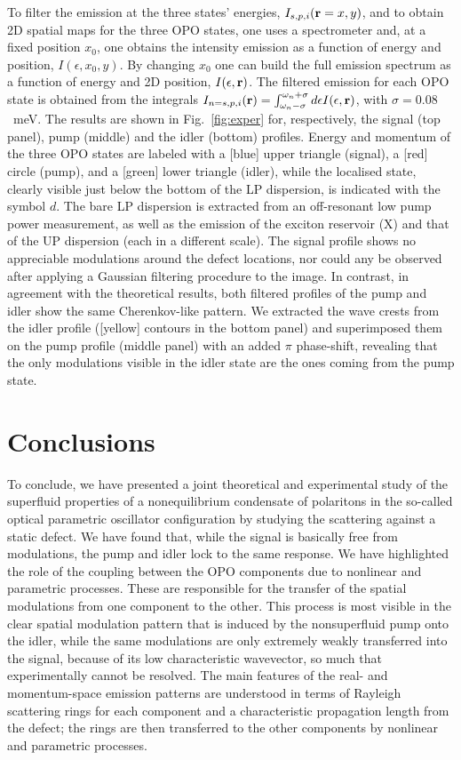 To filter the emission at the three states' energies,
$I_{s,p,i}(\mathbf{r}=x,y)$, and to obtain 2D spatial maps for the three
OPO states, one uses a spectrometer and, at a fixed position $x_0$,
one obtains the intensity emission as a function of energy and
position, $I(\epsilon,x_0,y)$. By changing $x_0$ one can build the
full emission spectrum as a function of energy and 2D position,
$I(\epsilon,\mathbf{r})$. The filtered emission for each OPO state is
obtained from the integrals
$I_{n=s,p,i}(\mathbf{r}) = \int_{\omega_n-\sigma}^{\omega_n+\sigma}
d\epsilon I(\epsilon, \mathbf{r})$, with $\sigma=0.08$~meV. The results
are shown in Fig.~\ref{fig:exper} for, respectively, the signal (top
panel), pump (middle) and the idler (bottom) profiles. Energy and
momentum of the three OPO states are labeled with a [blue] upper
triangle (signal), a [red] circle (pump), and a [green] lower triangle
(idler), while the localised state, clearly visible just below the
bottom of the LP dispersion, is indicated with the symbol $d$. The
bare LP dispersion is extracted from an off-resonant low pump power
measurement, as well as the emission of the exciton reservoir (X) and
that of the UP dispersion (each in a different scale).
%
The signal profile shows no appreciable modulations around the defect
locations, nor could any  be observed after applying a Gaussian
filtering procedure to the image.
%
In contrast, in agreement with the theoretical results, both filtered
profiles of the pump and idler show the same Cherenkov-like pattern. We
extracted the wave crests from the idler profile ([yellow] contours in
the bottom panel) and superimposed them on the pump profile (middle
panel) with an added $\pi$ phase-shift, revealing that the only
modulations visible in the idler state are the ones coming from the
pump state.


\section{Conclusions}
%
To conclude, we have presented a joint theoretical and experimental
study of the superfluid properties of a nonequilibrium condensate of
polaritons in the so-called optical parametric oscillator
configuration by studying the scattering against a static defect.
%
We have found that, while the signal is basically free from
modulations, the pump and idler lock to the same response. We have
highlighted the role of the coupling between the OPO components due to
nonlinear and parametric processes. These are responsible for the
transfer of the spatial modulations from one component to the
other. This process is most visible in the clear spatial modulation
pattern that is induced by the nonsuperfluid pump onto the idler,
while the same modulations are only extremely weakly transferred into
the signal, because of its low characteristic wavevector, so much that
experimentally cannot be resolved.
%
The main features of the real- and momentum-space emission patterns
are understood in terms of Rayleigh scattering rings for each
component and a characteristic propagation length from the defect; the
rings are then transferred to the other components by nonlinear and
parametric processes.

